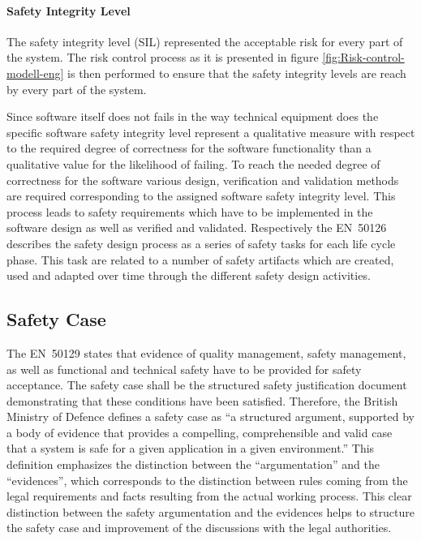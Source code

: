 \documentclass{template/openetcs_report}
\begin{document}
\paragraph{Safety Integrity Level}

The safety integrity level (SIL) represented the acceptable risk for every part of the system. The risk control process as it is presented in figure \ref{fig:Risk-control-modell-eng} is then performed to ensure that the safety integrity levels are reach by every part of the system.

Since software itself does not fails in the way technical equipment does the specific software safety integrity level represent a qualitative measure with respect to the required degree of correctness for the software functionality than a qualitative value for the likelihood of failing. To reach the needed degree of correctness for the software various design, verification and validation methods are required corresponding to the assigned software safety integrity level. This process leads to safety requirements which have to be implemented in the software design as well as verified and validated. Respectively the EN~50126 describes the safety design process as a series of safety tasks for each life cycle phase. This task are related to a number of safety artifacts which are created, used and adapted over time through the different safety design activities.


\subsection{Safety Case}

The EN~50129 states that evidence of quality management, safety management, as well as functional and technical safety have to be provided for safety acceptance. The safety case shall be the structured safety justification document demonstrating that these conditions have been satisfied.
Therefore, the British Ministry of Defence defines a safety case as “a structured argument, supported by a body of evidence that provides a compelling, comprehensible and valid case that a system is safe for a given application in a given environment.”\cite{MinistryofDefence.2007} This definition emphasizes the distinction between the “argumentation” and the “evidences”, which corresponds to the distinction between rules coming from the legal requirements and facts resulting from the actual working process. This clear distinction between the safety argumentation and the evidences helps to structure the safety case and improvement of the discussions with the legal authorities.\cite{Muller.2010}
\end{document}
